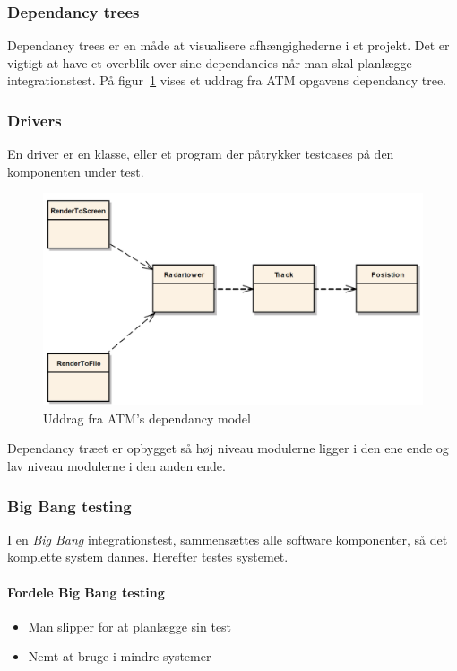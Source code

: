\subsubsection{Dependancy trees}
Dependancy trees er en måde at visualisere afhængighederne i et projekt. Det er vigtigt at have et overblik over sine dependancies når man skal planlægge integrationstest. På figur~\ref{fig:dependancyATM} vises et uddrag fra ATM opgavens dependancy tree.

\subsubsection{Drivers}
En driver er en klasse, eller et program der påtrykker testcases på den komponenten under test.

\begin{figure}[H]
\centering
\includegraphics[width=0.78\linewidth]{figs/dependancyATM.PNG}
\caption{Uddrag fra ATM's dependancy model}
\label{fig:dependancyATM}
\end{figure}

Dependancy træet er opbygget så høj niveau modulerne ligger i den ene ende og lav niveau modulerne i den anden ende.


\subsubsection{Big Bang testing}
I en \textit{Big Bang} integrationstest, sammensættes alle software komponenter, så det komplette system dannes. Herefter testes systemet.

\paragraph{Fordele Big Bang testing}
\begin{itemize}
	\item Man slipper for at planlægge sin test
	\item Nemt at bruge i mindre systemer
\end{itemize}

